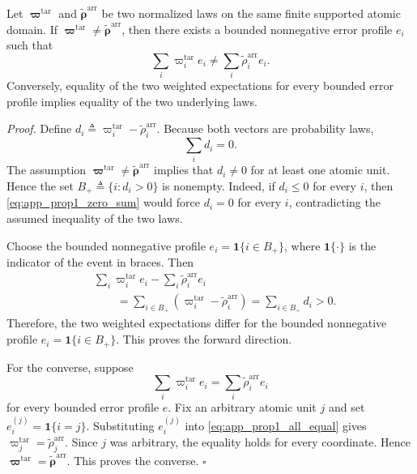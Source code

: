 \begin{proposition*}
Let $\boldsymbol\varpi^{\mathrm{tar}}$ and
$\widetilde{\boldsymbol\rho}^{\mathrm{arr}}$ be two normalized laws on the same
finite supported atomic domain.  If
$\boldsymbol\varpi^{\mathrm{tar}}\neq
\widetilde{\boldsymbol\rho}^{\mathrm{arr}}$, then there exists a bounded
nonnegative error profile $e_i$ such that
\begin{equation}
    \sum_i \varpi_i^{\mathrm{tar}}e_i
    \neq
    \sum_i \widetilde\rho_i^{\mathrm{arr}}e_i.
    \label{eq:app_prop1_claim}
\end{equation}
Conversely, equality of the two weighted expectations for every bounded error
profile implies equality of the two underlying laws.
\end{proposition*}

\noindent\emph{Proof.}
Define $d_i\triangleq\varpi_i^{\mathrm{tar}}-\widetilde\rho_i^{\mathrm{arr}}$.
Because both vectors are probability laws,
\begin{equation}
    \sum_i d_i=0.
    \label{eq:app_prop1_zero_sum}
\end{equation}
The assumption
$\boldsymbol\varpi^{\mathrm{tar}}\neq
\widetilde{\boldsymbol\rho}^{\mathrm{arr}}$
implies that $d_i\neq0$ for at least one atomic unit.  Hence the set
$B_+\triangleq\{i:d_i>0\}$
is nonempty.  Indeed, if $d_i\le0$ for every $i$, then
\eqref{eq:app_prop1_zero_sum} would force $d_i=0$ for every $i$, contradicting
the assumed inequality of the two laws.

Choose the bounded nonnegative profile
$e_i=\mathbf{1}\{i\in B_+\}$, where $\mathbf{1}\{\cdot\}$ is the indicator of
the event in braces.
Then
\begin{align}
 &
 \sum_i
 \varpi_i^{\mathrm{tar}}e_i
 -
 \sum_i
 \widetilde\rho_i^{\mathrm{arr}}e_i
 \nonumber\\
 &\qquad=
 \sum_{i\in B_+}
 \left(
 \varpi_i^{\mathrm{tar}}
 -
 \widetilde\rho_i^{\mathrm{arr}}
 \right)
 =
 \sum_{i\in B_+}d_i
 >0.
 \label{eq:app_prop1_difference}
\end{align}
Therefore, the two weighted expectations differ for the bounded nonnegative
profile $e_i=\mathbf{1}\{i\in B_+\}$.  This proves the forward direction.

For the converse, suppose
\begin{equation}
    \sum_i \varpi_i^{\mathrm{tar}}e_i
    =
    \sum_i \widetilde\rho_i^{\mathrm{arr}}e_i
    \label{eq:app_prop1_all_equal}
\end{equation}
for every bounded error profile $e$.  Fix an arbitrary atomic unit $j$ and set
$e_i^{(j)}=\mathbf{1}\{i=j\}$.
Substituting $e_i^{(j)}$ into
\eqref{eq:app_prop1_all_equal} gives
$\varpi_j^{\mathrm{tar}}=\widetilde\rho_j^{\mathrm{arr}}$.
Since $j$ was arbitrary, the equality holds for every coordinate.  Hence
$\boldsymbol\varpi^{\mathrm{tar}}=\widetilde{\boldsymbol\rho}^{\mathrm{arr}}$.
This proves the converse. \hfill$\square$

